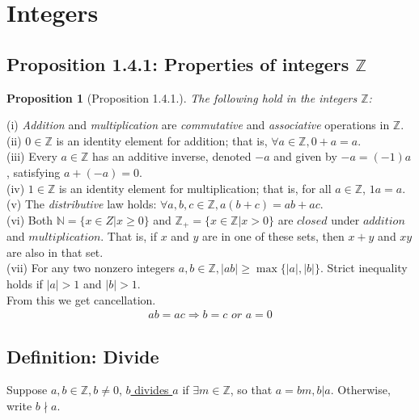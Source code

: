 \documentclass[11pt,a4paper]{article}
\newtheorem{proposition}{Proposition}
\begin{document}
\section{Integers}
\subsection{Proposition 1.4.1: Properties of integers $\mathbb{Z}$}
\begin{proposition}[Proposition 1.4.1.]
    The following hold in the integers $\mathbb{Z}$:
\end{proposition}
(i) \textit{Addition} and \textit{multiplication} are \textit{commutative} and \textit{associative} operations in $\mathbb{Z}$.\\
(ii) $0 \in \mathbb{Z}$ is an identity element for addition; that is, $\forall a \in \mathbb{Z}, 0 + a = a$.\\
(iii) Every $a \in \mathbb{Z}$ has an additive inverse, denoted $-a$ and given by $-a = (-1)a$, satisfying $a + (-a) = 0$.\\
(iv) $1 \in \mathbb{Z}$ is an identity element for multiplication; that is, for all $a \in \mathbb{Z}$, $1a = a.$\\
(v) The \textit{distributive} law holds: $\forall a,b,c \in \mathbb{Z}, a(b + c) = ab + ac$.\\
(vi) Both $\mathbb{N} = \{x \in Z | x \geq 0\}$ and $\mathbb{Z}_+ = \{x \in \mathbb{Z} | x > 0\}$ are $closed$ under $addition$ and $multiplication$.
That is, if $x$ and $y$ are in one of these sets, then $x + y$ and $xy$ are also in that set.\\
(vii) For any two nonzero integers $a,b\in\mathbb{Z}, |ab|\geq \max\{|a|,|b|\}$. Strict inequality holds if $|a| > 1$ and $|b| > 1$.\\

From this we get cancellation.
\begin{equation}
    \begin{aligned}
        ab=ac \Rightarrow	b=c \textit{ or } a=0
    \end{aligned}
    \nonumber
\end{equation}

\subsection{Definition: Divide}
Suppose $a,b\in\mathbb{Z},b\neq 0$, \underline{$b$ divides $a$} if $\exists m\in\mathbb{Z}$, so that $a=bm, b|a$. Otherwise, write $b \nmid a$.
\end{document}
